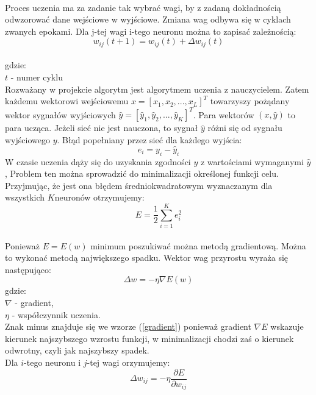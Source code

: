 \documentclass[a4paper, openright, twoside,11pt]{article}
\begin{document}
    \\
    Proces uczenia ma za zadanie tak wybrać wagi, by z zadaną dokładnością odwzorować dane wejściowe w wyjściowe. Zmiana wag odbywa się w cyklach zwanych epokami. Dla j-tej wagi i-tego neuronu można to zapisać zależnością:
    \begin{equation} \label{zmiana_wag}
    w_{ij}(t+1) = w_{ij}(t) + \Delta w_{ij}(t)
    \end{equation}\\
    gdzie:\\[0.1cm]
    $t$ - numer cyklu
    \\[0.5cm]
    Rozważany w projekcie algorytm jest algorytmem uczenia z nauczycielem. Zatem każdemu wektorowi wejściowemu $x = [x_1,x_2,...,x_L]^T$ towarzyszy pożądany wektor sygnałów wyjściowych $\hat{y} = [\hat{y}_1,\hat{y}_2,...,\hat{y}_K]^T$. Para wektorów $(x,\hat{y})$ to para ucząca. Jeżeli sieć nie jest nauczona, to sygnał $\hat{y}$ różni się od sygnału wyjściowego $y$. Błąd popełniany przez sieć dla każdego wyjścia:
    \begin{equation} \label{error}
    e_i = y_i - \hat{y}_i
    \end{equation}
    W czasie uczenia dąży się do uzyskania zgodności $y$ z wartościami wymaganymi $\hat{y}$, Problem ten można sprowadzić do minimalizacji określonej funkcji celu. Przyjmując, że jest ona błędem średniokwadratowym wyznaczanym dla wszystkich $K$neuronów otrzymujemy:
    \begin{equation} \label{error2}
    E = \frac{1}{2} \sum^K_{i=1} e^2_i
    \end{equation}\\
    Ponieważ $E=E(w)$ minimum poszukiwać można metodą gradientową. Można to wykonać metodą największego spadku. Wektor wag przyrostu wyraża się następująco:
    \begin{equation} \label{gradient}
    \Delta  w = - \eta \nabla E(w)
    \end{equation}
    gdzie:\\[0.3cm]
    $\nabla$ - gradient,\\[0.1cm]
    $\eta$ - współczynnik uczenia.\\[0.3cm]
    Znak minus znajduje się we wzorze (\ref{gradient}) ponieważ gradient $\nabla E$ wskazuje kierunek najszybszego wzrostu funkcji, w minimalizacji chodzi zaś o kierunek odwrotny, czyli jak najszybszy spadek.\\
    Dla $i$-tego neuronu i $j$-tej wagi orzymujemy:\\
    \begin{equation} \label{gradient2}
    \Delta  w_{ij} = - \eta \frac{\partial E}{\partial w_{ij}}
    \end{equation}\\[0.3cm]
\end{document}
